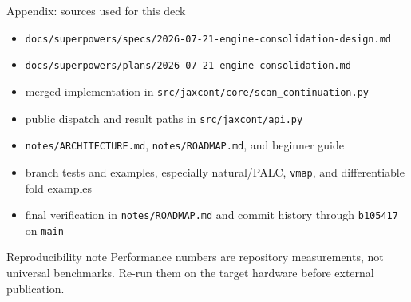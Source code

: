\documentclass[aspectratio=169,10pt]{beamer}
\begin{document}
\begin{frame}{Appendix: sources used for this deck}
\small
\begin{itemize}
  \item \texttt{docs/superpowers/specs/2026-07-21-engine-consolidation-design.md}
  \item \texttt{docs/superpowers/plans/2026-07-21-engine-consolidation.md}
  \item merged implementation in \texttt{src/jaxcont/core/scan\_continuation.py}
  \item public dispatch and result paths in \texttt{src/jaxcont/api.py}
  \item \texttt{notes/ARCHITECTURE.md}, \texttt{notes/ROADMAP.md}, and beginner guide
  \item branch tests and examples, especially natural/PALC, \texttt{vmap}, and differentiable fold examples
  \item final verification in \texttt{notes/ROADMAP.md} and commit history through \texttt{b105417} on \texttt{main}
\end{itemize}
\begin{block}{Reproducibility note}
Performance numbers are repository measurements, not universal benchmarks. Re-run them on the target hardware before external publication.
\end{block}
\end{frame}
\end{document}

